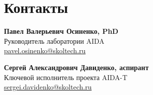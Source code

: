 \documentclass[12pt,a4paper]{article}
\begin{document}
\section{Контакты}
\textbf{Павел Валерьевич Осиненко, PhD}\\
    \indent Руководитель лаборатории AIDA\\
    \indent \href{mailto:pavel.osinenko@skoltech.ru}{pavel.osinenko@skoltech.ru}

\vspace{10pt}
\noindent \textbf{Сергей Александрович Давиденко, аспирант}\\
    \indent Ключевой исполнитель проекта AIDA-T\\
    \indent \href{mailto:sergei.davidenko@skoltech.ru}{sergei.davidenko@skoltech.ru}
\end{document}
